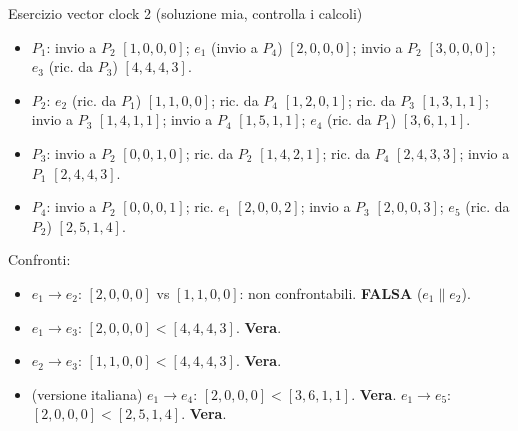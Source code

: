 \begin{approfondimento}{Esercizio vector clock 2 (soluzione mia, controlla i calcoli)}

\begin{itemize}
\tightlist
\item
  \(P_1\): invio a \(P_2\) \([1,0,0,0]\); \(e_1\) (invio a \(P_4\)) \([2,0,0,0]\); invio a \(P_2\) \([3,0,0,0]\); \(e_3\) (ric. da \(P_3\)) \([4,4,4,3]\).
\item
  \(P_2\): \(e_2\) (ric. da \(P_1\)) \([1,1,0,0]\); ric. da \(P_4\) \([1,2,0,1]\); ric. da \(P_3\) \([1,3,1,1]\); invio a \(P_3\) \([1,4,1,1]\); invio a \(P_4\) \([1,5,1,1]\); \(e_4\) (ric. da \(P_1\)) \([3,6,1,1]\).
\item
  \(P_3\): invio a \(P_2\) \([0,0,1,0]\); ric. da \(P_2\) \([1,4,2,1]\); ric. da \(P_4\) \([2,4,3,3]\); invio a \(P_1\) \([2,4,4,3]\).
\item
  \(P_4\): invio a \(P_2\) \([0,0,0,1]\); ric. \(e_1\) \([2,0,0,2]\); invio a \(P_3\) \([2,0,0,3]\); \(e_5\) (ric. da \(P_2\)) \([2,5,1,4]\).
\end{itemize}

Confronti:

\begin{itemize}
\tightlist
\item
  \(e_1 \to e_2\): \([2,0,0,0]\) vs \([1,1,0,0]\): non confrontabili. \textbf{FALSA} (\(e_1 \parallel e_2\)).
\item
  \(e_1 \to e_3\): \([2,0,0,0] < [4,4,4,3]\). \textbf{Vera}.
\item
  \(e_2 \to e_3\): \([1,1,0,0] < [4,4,4,3]\). \textbf{Vera}.
\item
  (versione italiana) \(e_1 \to e_4\): \([2,0,0,0] < [3,6,1,1]\). \textbf{Vera}. \(e_1 \to e_5\): \([2,0,0,0] < [2,5,1,4]\). \textbf{Vera}.
\end{itemize}

\end{approfondimento}


